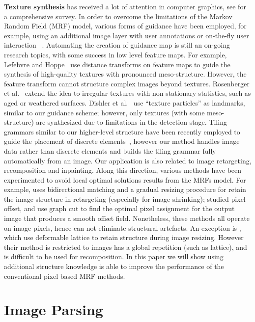\documentclass{acmtog}
\begin{document}
\textbf{Texture synthesis} has received a lot of attention in computer graphics, see \cite{Wei2009STAR} for a comprehensive survey. In order to overcome the limitations of the Markov Random Field (MRF) model, various forms of guidance have been employed, for example, using an additional image layer with user annotations \cite{Hertzmann2001IA} or on-the-fly user interaction ~\cite{Barnes2009,Hu2013PPI}. Automating the creation of guidance map is still an on-going research topics, with some success in low level feature maps. For example, Lefebvre and Hoppe~ use distance transforms on feature maps to guide the synthesis of high-quality textures with pronounced meso-structure. However, the feature transform cannot structure complex images beyond textures. Rosenberger et al.~ extend the idea to irregular textures with non-stationary statistics, such as aged or weathered surfaces. Dishler et al.~ use ``texture particles'' as landmarks, similar to our guidance scheme; however, only textures (with some meso-structure) are synthesized due to limitations in the detection stage. Tiling grammars similar to our higher-level structure have been recently employed to guide the placement of discrete elements~\cite{Ma2011DET,Ma2013DET}, however our method handles image data rather than discrete elements and builds the tiling grammar fully automatically from an image. Our application is also related to image retargeting, recomposition and inpainting. Along this direction, various methods have been experimented to avoid local optimal solutions results from the MRFs model. For example, \cite{Simakov2008SV} uses bidirectional matching and a gradual resizing procedure for retain the image structure in retargeting (especially for image shrinking); \cite{Pritch09ICCV,He2012PO} studied pixel offset, and use graph cut to find the optimal pixel assignment for the output image that produces a smooth offset field. Nonetheless, these methods all operate on image pixels, hence can not eliminate structural artefacts. An exception is \cite{Wu2010SS}, which use deformable lattice to retain structure during image resizing. However their method is restricted to images has a global repetition (such as lattice), and is difficult to be used for recomposition. In this paper we will show using additional structure knowledge is able to improve the performance of the conventional pixel based MRF methods. 

\section{Image Parsing}
\label{sec:ImageParsing}
\end{document}
